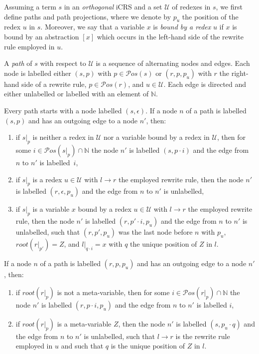 \documentclass{LMCS}
\theoremstyle{definition}
\newcommand{\rew}{\rightarrow}
\newcommand{\pos}[1]{\mathcal{P}os(#1)}
\newcommand{\rs}[1]{root(#1)}
\newcommand{\natnum}{\mathbb{N}}
\newcommand{\redpos}[1]{p_{#1}}
\begin{document}
Assuming a term $s$ in an \emph{orthogonal} iCRS and a set $\mathcal{U}$ of redexes in $s$, we first define paths and path projections, where we denote by $\redpos{u}$ the position of the redex $u$ in $s$. Moreover, we say that a variable $x$ is \emph{bound by a redex} $u$ if $x$ is bound by an abstraction $[x]$ which occurs in the left-hand side of the rewrite rule employed in $u$.
\begin{defi}
A \emph{path} of $s$ with respect to $\mathcal{U}$ is a sequence of alternating nodes and edges. Each node is labelled either $(s, p)$ with $p \in \pos{s}$ or $(r, p, \redpos{u})$ with $r$ the right-hand side of a rewrite rule, $p \in \pos{r}$, and $u \in \mathcal{U}$. Each edge is directed and either unlabelled or labelled with an element of $\natnum$.

Every path starts with a node labelled $(s, \epsilon)$. If a node $n$ of a path is labelled $(s, p)$ and has an outgoing edge to a node $n'$, then:
\begin{enumerate}[(1)]
\item
if $s|_p$ is neither a redex in $\mathcal{U}$ nor a variable bound by a redex in $\mathcal{U}$, then for some $i \in \pos{s|_p} \cap \natnum$ the node $n'$ is labelled $(s, p \cdot i)$ and the edge from $n$ to $n'$ is labelled~$i$,
\item
if $s|_p$ is a redex $u \in \mathcal{U}$ with $l \rew r$ the employed rewrite rule, then the node $n'$ is labelled $(r, \epsilon, \redpos{u})$ and the edge from $n$ to $n'$ is unlabelled,
\item
if $s|_p$ is a variable $x$ bound by a redex $u \in \mathcal{U}$ with $l \rew r$ the employed rewrite rule, then the node $n'$ is labelled $(r, p' \cdot i, \redpos{u})$ and the edge from $n$ to $n'$ is unlabelled, such that $(r, p', \redpos{u})$ was the last node before $n$ with $\redpos{u}$, $\rs{r|_{p'}} = Z$, and $l|_{q \cdot i} = x$ with $q$ the unique position of $Z$ in $l$.
\end{enumerate}
If a node $n$ of a path is labelled $(r, p, \redpos{u})$ and has an outgoing edge to a node $n'$, then:
\begin{enumerate}[(1)]
\item
if $\rs{r|_p}$ is not a meta-variable, then for some $i \in \pos{r|_p} \cap \natnum$ the node $n'$ is labelled $(r, p \cdot i, \redpos{u})$ and the edge from $n$ to $n'$ is labelled $i$,
\item
if $\rs{r|_p}$ is a meta-variable $Z$, then the node $n'$ is labelled $(s, \redpos{u} \cdot q)$ and the edge from $n$ to $n'$ is unlabelled, such that $l \rew r$ is the rewrite rule employed in $u$ and such that $q$ is the unique position of $Z$ in $l$.
\end{enumerate}
\end{defi}
\end{document}

